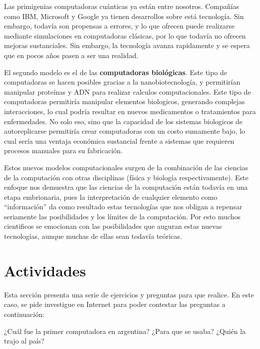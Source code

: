 Las primigenias computadoras cuánticas ya están entre nosotros. Compañías como
IBM, Microsoft y Google ya tienen desarrollos sobre está tecnología. Sin embargo,
todavía son propensas a errores, y lo que ofrecen puede realizarse mediante
simulaciones en computadoras clásicas, por lo que todavía no ofrecen mejoras
sustanciales. Sin embargo, la tecnología avanza rapidamente y se espera que en
pocos años pasen a ser una realidad.\autocite{mit_tech_2018_02}

El segundo modelo es el de las \textbf{computadoras biológicas}. Este tipo de
computadoras se hacen posibles gracias a la nanobiotecnología, y permitirían
manipular proteínas y ADN para realizar calculos computacionales. Este tipo de
computadoras permitiría manipular elementos biologicos, generando complejas
interacciones, lo cual podría resultar en nuevos medicamentos o tratamientos
para enfermedades.\autocite{freitas_1999} No solo eso, sino que la capacidad de
los sistemas biologicos de autoreplicarse permitiría crear computadoras con un
costo sumamente bajo, lo cual sería una ventaja económica sustancial frente a
sistemas que requieren procesos manuales para su fabricación.

Estos nuevos modelos computacionales surgen de la combinación de las ciencias de
la computación con otras disciplinas (física y biología respectivamente). Este
enfoque nos demuestra que las ciencias de la computación están todavía en una
etapa embrionaria, pues la interpretación de cualquier elemento como ``información''
da como resultado estas tecnologías que nos obligan a repensar seriamente
las posibilidades y los límites de la computación. Por esto muchos cientificos 
se emocionan con las posibilidades que auguran estas nuevas tecnologías, aunque
muchas de ellas sean todavía teóricas.

\section{Actividades}

Esta sección presenta una serie de ejercicios y preguntas para que realice.
En este caso, se pide investigue en Internet para poder contestar las 
preguntas a continuación:

\begin{exercise}
¿Cuál fue la primer computadora en argentina?
¿Para que se usaba? ¿Quién la trajo al país?
\end{exercise}

